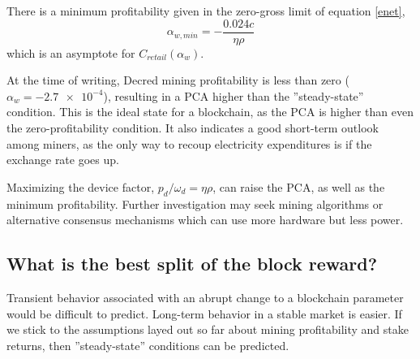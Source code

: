 \documentclass[a4paper,12pt]{article}
\begin{document}
There is a minimum profitability given in the zero-gross limit of equation \ref{enet},
%
\begin{equation}
\alpha_{w, min} = - \frac{ 0.024 c }{ \eta \rho }
\end{equation}
%
which is an asymptote for $ C_{retail}(\alpha_w) $.

At the time of writing, Decred mining profitability is less than zero ($ \alpha_w = \num{-2.7e-4} $), resulting in a PCA higher than the ''steady-state'' condition. This is the ideal state for a blockchain, as the PCA is higher than even the zero-profitability condition. It also indicates a good short-term outlook among miners, as the only way to recoup electricity expenditures is if the exchange rate goes up. 

Maximizing the device factor, $ p_d / \omega_d = \eta \rho $, can raise the PCA, as well as the minimum profitability. Further investigation may seek mining algorithms or alternative consensus mechanisms which can use more hardware but less power.

\subsection{What is the best split of the block reward?}

Transient behavior associated with an abrupt change to a blockchain parameter would be difficult to predict. Long-term behavior in a stable market is easier. If we stick to the assumptions layed out so far about mining profitability and stake returns, then ''steady-state'' conditions can be predicted. 
\end{document}
